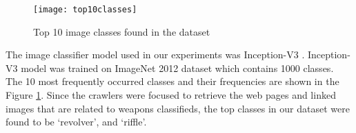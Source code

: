 \begin{figure}[h]
	\texttt{[image: top10classes]}
	\caption{Top 10 image classes found in the dataset}
	\label{fig:top10ImgClass}
\end{figure}
The image classifier model used in our experiments was Inception-V3 \cite{SzegedyVISW15}. Inception-V3 model was trained on ImageNet 2012 dataset which contains 1000 classes\cite{ILSVRC15}.
The 10 most frequently occurred classes and their frequencies are shown in the Figure \ref{fig:top10ImgClass}. Since the crawlers were focused to retrieve the web pages and linked images that are related to weapons classifieds, the top classes in our dataset were found to be `revolver', and `riffle'.
